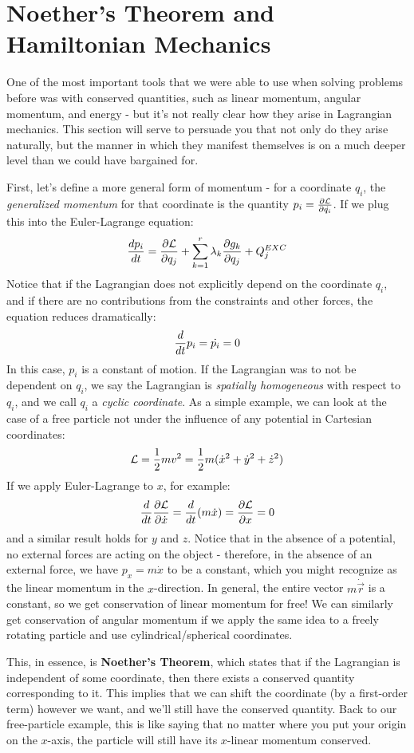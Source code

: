 \section{Noether's Theorem and Hamiltonian Mechanics}
One of the most important tools that we were able to use when solving problems before was with conserved quantities, such as linear momentum, angular momentum, and energy - but it's not really clear how they arise in Lagrangian mechanics. This section will serve to persuade you that not only do they arise naturally, but the manner in which they manifest themselves is on a much deeper level than we could have bargained for. 

First, let's define a more general form of momentum - for a coordinate $q_i$, the \textit{generalized momentum} for that coordinate is the quantity $p_i = \frac{\partial \mathcal{L}}{\partial \dot{q_i}}$. If we plug this into the Euler-Lagrange equation:
\[
	\frac{d p_i}{d t} = \frac{\partial \mathcal{L}}{\partial q_j} + \sum_{k=1}^r \lambda_k \frac{\partial g_k}{\partial q_j} + Q^{EXC}_j
\]
Notice that if the Lagrangian does not explicitly depend on the coordinate $q_i$, and if there are no contributions from the constraints and other forces, the equation reduces dramatically: 
\[
	\frac{d }{d t}p_i = \dot{p_i} = 0
\]
In this case, $p_i$ is a constant of motion. If the Lagrangian was to not be dependent on $q_i$, we say the Lagrangian is \textit{spatially homogeneous} with respect to $q_i$, and we call $q_i$ a \textit{cyclic coordinate}. As a simple example, we can look at the case of a free particle not under the influence of any potential in Cartesian coordinates:
\[
	\mathcal{L} = \frac{1}{2} m v^2 = \frac{1}{2} m ( \dot{x}^2 + \dot{y}^2 + \dot{z}^2 )
\]
If we apply Euler-Lagrange to $x$, for example: 
\[
	\frac{d }{d t}\frac{\partial \mathcal{L}}{\partial \dot{x}} = \frac{d }{d t} (m \dot{x}) = \frac{\partial \mathcal{L}}{\partial x} = 0 
\]
and a similar result holds for $y$ and $z$. Notice that in the absence of a potential, no external forces are acting on the object - therefore, in the absence of an external force, we have  $p_x = m \dot {x}$ to be a constant, which you might recognize as the linear momentum in the $x$-direction. In general, the entire vector $m \dot{\vec{r}}$ is a constant, so we get conservation of linear momentum for free! We can similarly get conservation of angular momentum if we apply the same idea to a freely rotating particle and use cylindrical/spherical coordinates. 

This, in essence, is \textbf{Noether's Theorem}, which states that if the Lagrangian is independent of some coordinate, then there exists a conserved quantity corresponding to it. This implies that we can shift the coordinate (by a first-order term) however we want, and we'll still have the conserved quantity. Back to our free-particle example, this is like saying that no matter where you put your origin on the $x$-axis, the particle will still have its $x$-linear momentum conserved. 

